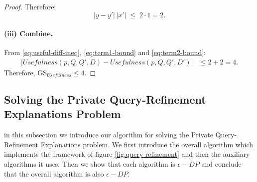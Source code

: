 \begin{proof}
Therefore:
\begin{equation}
|y - y'|\,|x'|\;\leq\; 2\cdot 1=2.
\label{eq:term2-bound}
\end{equation}

\paragraph{(iii) Combine.}
From \eqref{eq:useful-diff-ineq}, \eqref{eq:term1-bound} and \eqref{eq:term2-bound}:
\begin{align}
|Usefulness(p,Q,Q',D) - Usefulness(p,Q,Q',D')| &\leq 2 +2 = 4.
\end{align}
Therefore, \(\mathrm{GS}_{Usefulness} \leq 4\).
\end{proof}

\subsection{Solving the Private Query-Refinement Explanations Problem}
in this subsection we introduce our algorithm for solving the Private Query-Refinement Explanations problem.
We first introduce the overall algorithm which implements the framework of figure \ref{fig:query-refinement} and then the auxiliary algorithms it uses. Then we show that each algorithm is $\epsilon-DP$ and conclude that the overall algorithm is also $\epsilon-DP$.




